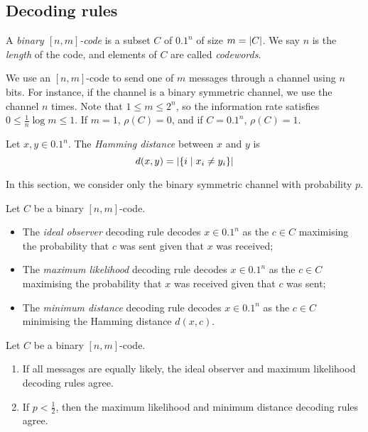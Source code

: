 \subsection{Decoding rules}
\begin{definition}
    A \emph{binary \( [n,m] \)-code} is a subset \( C \) of \( \qty{0,1}^n \) of size \( m = \abs{C} \).
    We say \( n \) is the \emph{length} of the code, and elements of \( C \) are called \emph{codewords}.
\end{definition}
We use an \( [n,m] \)-code to send one of \( m \) messages through a channel using \( n \) bits.
For instance, if the channel is a binary symmetric channel, we use the channel \( n \) times.
Note that \( 1 \leq m \leq 2^n \), so the information rate satisfies \( 0 \leq \frac{1}{n} \log m \leq 1 \).
If \( m = 1 \), \( \rho(C) = 0 \), and if \( C = \qty{0,1}^n \), \( \rho(C) = 1 \).
\begin{definition}
    Let \( x, y \in \qty{0,1}^n \).
    The \emph{Hamming distance} between \( x \) and \( y \) is
    \[ d(x,y) = \abs{\qty{i \mid x_i \neq y_i}} \]
\end{definition}
In this section, we consider only the binary symmetric channel with probability \( p \).
\begin{definition}
    Let \( C \) be a binary \( [n,m] \)-code.
    \begin{itemize}
        \item The \emph{ideal observer} decoding rule decodes \( x \in \qty{0,1}^n \) as the \( c \in C \) maximising the probability that \( c \) was sent given that \( x \) was received;
        \item The \emph{maximum likelihood} decoding rule decodes \( x \in \qty{0,1}^n \) as the \( c \in C \) maximising the probability that \( x \) was received given that \( c \) was sent;
        \item The \emph{minimum distance} decoding rule decodes \( x \in \qty{0,1}^n \) as the \( c \in C \) minimising the Hamming distance \( d(x,c) \).
    \end{itemize}
\end{definition}
\begin{lemma}
    Let \( C \) be a binary \( [n,m] \)-code.
    \begin{enumerate}
        \item If all messages are equally likely, the ideal observer and maximum likelihood decoding rules agree.
        \item If \( p < \frac{1}{2} \), then the maximum likelihood and minimum distance decoding rules agree.
    \end{enumerate}
\end{lemma}
